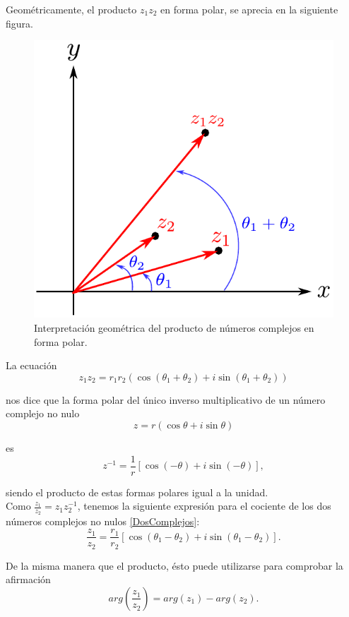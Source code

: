 Geométricamente, el producto $z_1z_2$ en forma polar, se aprecia en la siguiente figura.

\begin{figure}[H]
    \centering
    \includegraphics[scale=0.6]{Figuras/MultiplicacionComplejos.pdf}
    \caption{Interpretación geométrica del producto de números complejos en forma polar.}
    \label{ProductosComplejos}
\end{figure}

La ecuación 
$$z_1 z_2 = r_1r_2 (\cos(\theta_1 + \theta_2) + i \sin(\theta_1 +  \theta_2))$$

nos dice que la forma polar del único inverso multiplicativo de un número complejo no nulo
$$z = r (\cos \theta + i \sin \theta)$$

es
$$z^{-1} = \frac{1}{r} [\cos(-\theta) + i \sin(-\theta)],$$

siendo el producto de estas formas polares igual a la unidad.
\\

Como $\frac{z_1}{z_2} = z_1z_2^{-1}$, tenemos la siguiente expresión para el cociente de los dos números complejos no nulos \eqref{DosComplejos}:
$$\frac{z_1}{z_2} = \frac{r_1}{r_2} [\cos (\theta_1 - \theta_2) + i \sin(\theta_1- \theta_2)].$$

De la misma manera que el producto, ésto puede utilizarse para comprobar la afirmación
$$arg\left( \frac{z_1}{z_2} \right) = arg(z_1) - arg(z_2).$$
 
